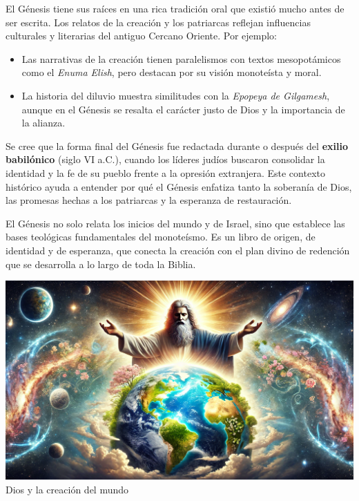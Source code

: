 El Génesis tiene sus raíces en una rica tradición oral que existió mucho antes de ser escrita. Los relatos de la creación y los patriarcas reflejan influencias culturales y literarias del antiguo Cercano Oriente. Por ejemplo:
\begin{itemize}
	\item Las narrativas de la creación tienen paralelismos con textos mesopotámicos como el \textit{Enuma Elish}, pero destacan por su visión monoteísta y moral.
	\item La historia del diluvio muestra similitudes con la \textit{Epopeya de Gilgamesh}, aunque en el Génesis se resalta el carácter justo de Dios y la importancia de la alianza.
\end{itemize}

Se cree que la forma final del Génesis fue redactada durante o después del \textbf{exilio babilónico} (siglo VI a.C.), cuando los líderes judíos buscaron consolidar la identidad y la fe de su pueblo frente a la opresión extranjera. Este contexto histórico ayuda a entender por qué el Génesis enfatiza tanto la soberanía de Dios, las promesas hechas a los patriarcas y la esperanza de restauración.


El Génesis no solo relata los inicios del mundo y de Israel, sino que establece las bases teológicas fundamentales del monoteísmo. Es un libro de origen, de identidad y de esperanza, que conecta la creación con el plan divino de redención que se desarrolla a lo largo de toda la Biblia.



\begin{center}
	\includegraphics[width=0.99\linewidth]{graficas/genesis1}\\
	Dios y la creación del mundo
\end{center}





